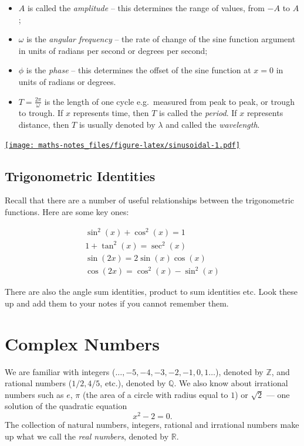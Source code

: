 \documentclass[
]{book}
\providecommand{\tightlist}{%
  \setlength{\itemsep}{0pt}\setlength{\parskip}{0pt}}
\theoremstyle{definition}
\theoremstyle{definition}
\theoremstyle{definition}
\theoremstyle{definition}
\theoremstyle{remark}
\begin{document}
\begin{itemize}
\tightlist
\item
  \(A\) is called the \emph{amplitude} -- this determines the range of values, from \(-A\) to \(A\);
\item
  \(\omega\) is the \emph{angular frequency} -- the rate of change of the sine function argument in units of radians per second or degrees per second;
\item
  \(\phi\) is the \emph{phase} -- this determines the offset of the sine function at \(x=0\) in units of radians or degrees.
\item
  \(T=\frac{2\pi}{\omega}\) is the length of one cycle e.g.~measured from peak to peak, or trough to trough. If \(x\) represents time, then \(T\) is called the \emph{period}. If \(x\) represents distance, then \(T\) is usually denoted by \(\lambda\) and called the \emph{wavelength}.
\end{itemize}

\href{https://www.desmos.com/calculator/l0f1omebm2}{\texttt{[image: maths-notes\_files/figure-latex/sinusoidal-1.pdf]}}

\hypertarget{trigonometric-identities}{%
\section{Trigonometric Identities}\label{trigonometric-identities}}

Recall that there are a number of useful relationships between the trigonometric functions. Here are some key ones:

\begin{gather*}
\sin^2(x)+\cos^2(x)=1\\
1+\tan^2(x)=\sec^2(x)\\
\sin(2x)=2\sin(x)\cos(x)\\
\cos(2x)=\cos^2(x)-\sin^2(x)
\end{gather*}

There are also the angle sum identities, product to sum identities etc. Look these up and add them to your notes if you cannot remember them.

\hypertarget{complex}{%
\chapter{Complex Numbers}\label{complex}}

We are familiar with integers (\(\dots, -5, -4, -3, -2, -1, 0, 1 \dots\)), denoted by \(\mathbb{Z}\), and rational numbers (\(1/2, 4/5\), etc.), denoted by \(\mathbb{Q}\). We also know about irrational numbers such as \(e\), \(\pi\) (the area of a circle with radius equal to \(1\)) or \(\sqrt{2}\) --- one solution of the quadratic equation
\[
x^2 - 2 = 0.
\]
The collection of natural numbers, integers, rational and irrational numbers make up what we call the \emph{real numbers}, denoted by \(\mathbb{R}\).
\end{document}
